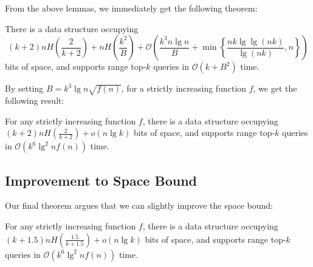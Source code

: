 \documentclass[runningheads]{llncs}
\newcommand{\Oh}{\mathcal{O}}
\begin{document}
From the above lemmas, we immediately get the following theorem:

\begin{theorem}
There is a data structure occupying
$$(k+2)n H\left(\frac{2}{k+2}\right) + nH\left(\frac{k^2}{B}\right) + \Oh\left(\frac{k^3 n \lg
  n}{ B} + \min\left\{\frac{nk \lg\lg(nk) }{\lg (nk)},n\right\}\right)$$ bits of space,
and supports range top-$k$ queries in $\Oh(k + B^2)$ time.
\end{theorem}

By setting $B = k^{3}\lg n \sqrt{f(n)}$, for a strictly increasing
function $f$, we get the following result:

\begin{corollary}
For any strictly increasing function $f$, there is a data structure
occupying $(k+2)n H(\frac{2}{k+2}) + o(n \lg k)$ bits of space, and
supports range top-$k$ queries in $\Oh(k^6 \lg^2 n f(n))$ time.
\end{corollary}

\subsection{Improvement to Space Bound}

Our final theorem argues that we can slightly improve the space bound:

\begin{theorem}
\label{thm:ds-final} 
For any strictly increasing function $f$, there is a data structure
occupying $(k+1.5)n H\left(\frac{1.5}{k+1.5}\right) + o(n \lg k)$ bits
of space, and supports range top-$k$ queries in $\Oh(k^6 \lg^2 n
f(n))$ time.
\end{theorem}
\end{document}
